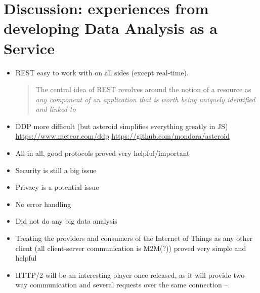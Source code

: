 \section{Discussion: experiences from developing Data Analysis as a Service}
\begin{itemize}
    \item REST easy to work with on all sides (except real-time).

    \blockquote[{\cite[100]{uckelmann-harrison-michahelles:architecting-the-internet-of-things:2011}}]{The central idea of REST revolves around the notion of a resource as \textit{any component of an application that is worth being uniquely identified and linked to}}.

    \item DDP more difficult (but asteroid simplifies everything greatly in JS) \url{https://www.meteor.com/ddp} \url{https://github.com/mondora/asteroid}
    \item All in all, good protocols proved very helpful/important
    \item Security is still a big issue
    \item Privacy is a potential issue
    \item No error handling
    \item Did not do any big data analysis
    \item Treating the providers and consumers of the Internet of Things as any other client (all client-server communication is M2M(?)) proved very simple and helpful
    \item HTTP/2 will be an interesting player once released, as it will provide two-way communication and several requests over the same connection –. 
\end{itemize}
